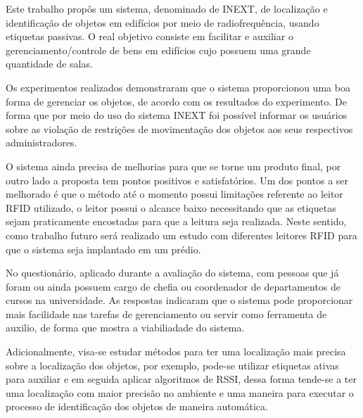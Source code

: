 
\label{chapter:consideracoes}

Este trabalho propôs um sistema, denominado de INEXT, de localização e identificação de objetos em edifícios por meio de
radiofrequência, usando etiquetas passivas. O real objetivo consiste em facilitar e auxiliar o gerenciamento/controle de
bens em edifícios cujo possuem uma grande quantidade de salas.


\par
Os experimentos realizados demonstraram que o sistema proporcionou uma boa forma de gerenciar os objetos, de acordo com os resultados do experimento. De forma que por meio do uso do sistema INEXT foi possível informar os usuários sobre as violação de restrições de movimentação dos objetos aos seus respectivos administradores. 


O sistema ainda precisa de melhorias para que se torne um produto final, por outro lado a proposta tem pontos positivos e satisfatórios. Um dos pontos a ser melhorado é 
que o método até o momento possui limitações referente ao leitor RFID utilizado, o leitor possui o alcance baixo necessitando que as etiquetas sejam praticamente encostadas para que a leitura seja realizada. Neste sentido, como trabalho futuro será realizado um estudo com diferentes leitores RFID para que o sistema seja implantado em um prédio.

\par
No questionário, aplicado durante a avaliação do sistema, com pessoas que já foram ou ainda possuem cargo de chefia ou coordenador de departamentos de cursos na universidade. As respostas indicaram que o sistema pode proporcionar mais facilidade nas tarefas de gerenciamento ou servir como ferramenta de auxilio, de forma que mostra a viabiliadade do sistema.

Adicionalmente, visa-se estudar métodos para ter uma localização mais precisa sobre a localização dos objetos, por exemplo, pode-se utilizar etiquetas ativas para auxiliar e em seguida aplicar algoritmos de RSSI, dessa forma tende-se a ter uma localização com maior precisão no ambiente e uma maneira para executar o processo de identificação dos objetos de maneira automática. 



